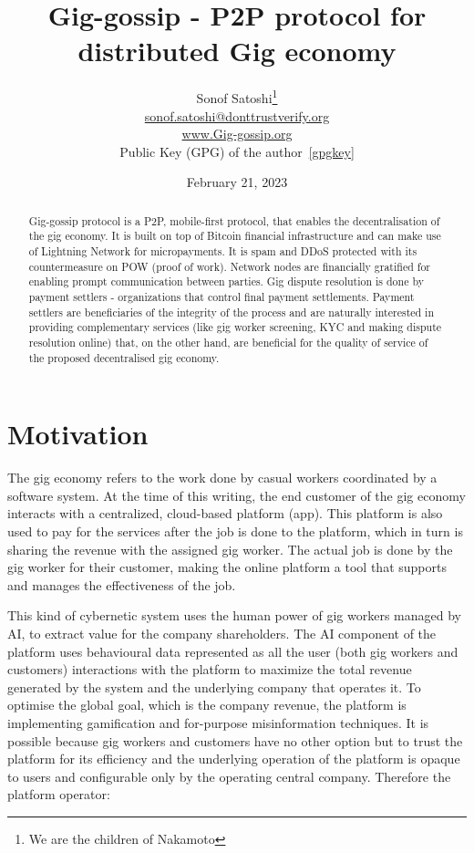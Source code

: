 \documentclass{article}
\title{Gig-gossip - P2P protocol for distributed Gig economy}
\date{February 21, 2023}
\author{
	{Sonof Satoshi}\thanks{We are the children of Nakamoto} \\
	\href{mailto:sonof.satoshi@donttrustverify.org}{sonof.satoshi@donttrustverify.org}\\
	\href{https://www.Gig-gossip.org}{www.Gig-gossip.org}\\
	Public Key (GPG) of the author~\ref{gpgkey} \\
}
\begin{document}
\maketitle

\begin{abstract}
Gig-gossip protocol is a P2P, mobile-first protocol, that enables the decentralisation of the gig economy. It is built on top of Bitcoin financial infrastructure and can make use of Lightning Network for micropayments. It is spam and DDoS protected with its countermeasure on POW (proof of work). Network nodes are financially gratified for enabling prompt communication between parties. Gig dispute resolution is done by payment settlers - organizations that control final payment settlements. Payment settlers are beneficiaries of the integrity of the process and are naturally interested in providing complementary services (like gig worker screening, KYC and making dispute resolution online) that, on the other hand, are beneficial for the quality of service of the proposed decentralised gig economy.
\end{abstract}


\section{Motivation}
The gig economy refers to the work done by casual workers coordinated by a software system. At the time of this writing, the end customer of the gig economy interacts with a centralized, cloud-based platform (app). This platform is also used to pay for the services after the job is done to the platform, which in turn is sharing the revenue with the assigned gig worker. The actual job is done by the gig worker for their customer, making the online platform a tool that supports and manages the effectiveness of the job.

This kind of cybernetic system uses the human power of gig workers managed by AI, to extract value for the company shareholders. The AI component of the platform uses behavioural data represented as all the user (both gig workers and customers) interactions with the platform to maximize the total revenue generated by the system and the underlying company that operates it. To optimise the global goal, which is the company revenue, the platform is implementing gamification and for-purpose misinformation techniques. It is possible because gig workers and customers have no other option but to trust the platform for its efficiency and the underlying operation of the platform is opaque to users and configurable only by the operating central company. Therefore the platform operator:
\end{document}
